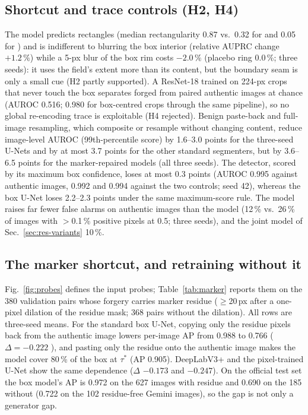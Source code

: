 \subsection{Shortcut and trace controls (H2, H4)}
\label{sec:res-controls}
The \GTb{} model predicts rectangles (median rectangularity 0.87 vs.\ 0.32 for \GTp{} and 0.05 for \GTg) and is indifferent to blurring the box interior (relative AUPRC change $+1.2\,\%$) while a 5-px blur of the box rim costs $-2.0\,\%$ (placebo ring 0.0\,\%; three seeds): it uses the field's extent more than its content, but the boundary seam is only a small cue (H2 partly supported). A ResNet-18 trained on 224-px crops that never touch the box separates forged from paired authentic images at chance (AUROC 0.516; 0.980 for box-centred crops through the same pipeline), so no global re-encoding trace is exploitable (H4 rejected). Benign paste-back and full-image resampling, which composite or resample without changing content, reduce image-level AUROC (99th-percentile score) by 1.6--3.0 points for the three-seed U-Nets and by at most 3.7 points for the other standard segmenters, but by 3.6--6.5 points for the marker-repaired models (all three seeds). The detector, scored by its maximum box confidence, loses at most 0.3 points (AUROC 0.995 against authentic images, 0.992 and 0.994 against the two controls; seed 42), whereas the box U-Net loses 2.2--2.3 points under the same maximum-score rule. The \GTp{} model raises far fewer false alarms on authentic images than the \GTb{} model (12\,\% vs.\ 26\,\% of images with $>$0.1\,\% positive pixels at 0.5; three seeds), and the joint model of Sec.~\ref{sec:res-variants} 10\,\%.

\subsection{The marker shortcut, and retraining without it}
\label{sec:res-marker}
Fig.~\ref{fig:probes} defines the input probes; Table~\ref{tab:marker} reports them on the 380 validation pairs whose forgery carries marker residue ($\ge$20\,px after a one-pixel dilation of the residue mask; 368 pairs without the dilation). All rows are three-seed means. For the standard box U-Net, copying only the residue pixels back from the authentic image lowers per-image AP from 0.988 to 0.766 ($\Delta{=}-0.222$ ), and pasting only the residue onto the authentic image makes the model cover 80\,\% of the box at $\tau^*$ (AP 0.905). DeepLabV3+ and the pixel-trained U-Net show the same dependence ($\Delta$ $-0.173$ and $-0.247$). On the official test set the box model's AP is 0.972 on the 627 images with residue and 0.690 on the 185 without (0.722 on the 102 residue-free Gemini images), so the gap is not only a generator gap.

